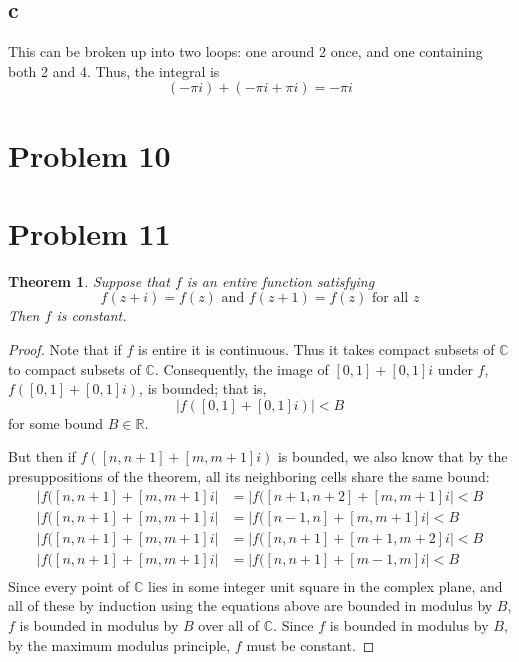 \documentclass{article}
\newtheorem{theorem}[subsection]{Theorem}
\theoremstyle{definition}
\newcommand{\R}{\mathbb{R}}
\newcommand{\Co}{\mathbb{C}}
\newcommand{\abs}[1]{\left|#1\right|}
\begin{document}
\subsection{c}
This can be broken up into two loops: one around 2 once, and one containing both 2
and 4. Thus, the integral is
\[ (-\pi i) + (-\pi i + \pi i) = - \pi i \]
\section{Problem 10}
\section{Problem 11}
\begin{theorem}
Suppose that $f$ is an entire function satisfying 
\[
f(z+i)=f(z) \text{ and } f(z+1)=f(z) \text{ for all } z
\]
Then $f$ is constant.
\end{theorem}
\begin{proof}
Note that if $f$ is entire it is continuous. Thus it takes compact subsets of $\Co$ to
compact subsets of $\Co$. Consequently, 
the image of $[0,1]+[0,1]i$ under $f$, $f([0,1] + [0,1]i)$, is bounded; that is,
\[
\abs{f([0,1]+[0,1]i)} < B
\]
for some bound $B \in \R$.

But then if $f([n,n+1] + [m,m+1]i)$ is bounded, we also know that by the presuppositions
of the theorem, all its neighboring cells share the same bound:
\begin{align*}
\abs{f([n,n+1]+[m,m+1]i}&=\abs{f([n+1,n+2]+[m,m+1]i} < B \\
\abs{f([n,n+1]+[m,m+1]i}&=\abs{f([n-1,n]+[m,m+1]i} < B \\
\abs{f([n,n+1]+[m,m+1]i}&=\abs{f([n,n+1]+[m+1,m+2]i} < B \\
\abs{f([n,n+1]+[m,m+1]i}&=\abs{f([n,n+1]+[m-1,m]i} < B \\
\end{align*}
Since every point of $\Co$ lies in some integer unit square in the complex
plane, and all of these by induction using the equations above are bounded
in modulus by $B$, $f$ is bounded in modulus by $B$ over all of $\Co$.
Since $f$ is bounded
in modulus by $B$, by the maximum modulus principle, $f$ must be constant.
\end{proof}
\end{document}
